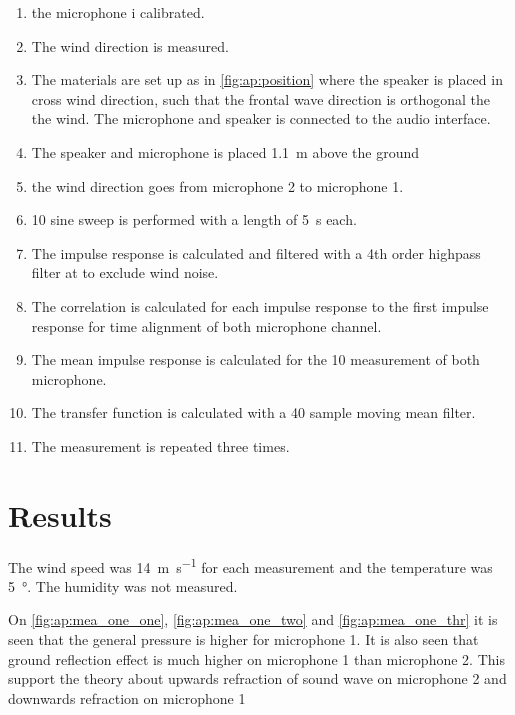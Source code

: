 \begin{enumerate}
\item the microphone i calibrated.
\item The wind direction is measured.
\item The materials are set up as in \autoref{fig:ap:position} where the speaker is placed in cross wind direction, such that the frontal wave direction is orthogonal the the wind. The microphone and speaker is connected to the audio interface.
\item The speaker and microphone is placed \SI{1.1}{\meter} above the ground
\item the wind direction goes from microphone 2 to microphone 1.
\item 10 sine sweep is performed with a length of \SI{5}{\second} each. 
\item The impulse response is calculated and filtered with a 4th order highpass filter at  to exclude wind noise.
\item The correlation is calculated for each impulse response to the first impulse response for time alignment \citep{gunness2001loudspeaker} of both microphone channel.
\item The mean impulse response is calculated for the 10 measurement of both microphone.
\item The transfer function is calculated with a 40 sample moving mean filter.
\item The measurement is repeated three times.
\end{enumerate}


\section*{Results}

The wind speed was \SI{14}{\meter\per\second} for each measurement and the temperature was \SI{5}{\degree}. The humidity was not measured. 


On \autoref{fig:ap:mea_one_one}, \autoref{fig:ap:mea_one_two} and \autoref{fig:ap:mea_one_thr} it is seen that the general pressure is higher for microphone 1. It is also seen that ground reflection effect is much higher on microphone 1 than microphone 2. This support the theory about upwards refraction of sound wave on microphone 2 and downwards refraction on microphone 1 



